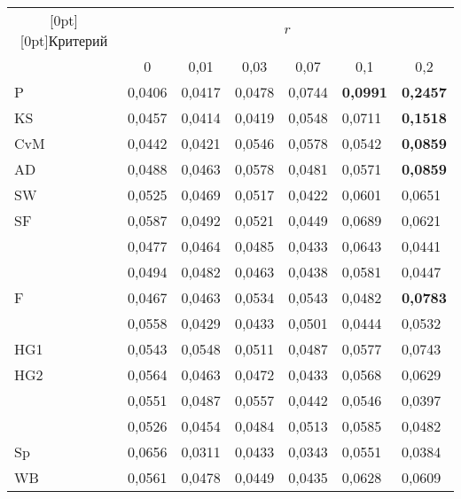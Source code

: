 \begin{table*}\small  %
\begin{center}
\vspace*{2ex}

\begin{tabular}{|l|l|l|l|l|l|l|}
\hline
\multicolumn{1}{|c|}{\raisebox{-6pt}[0pt][0pt]{Критерий}}& \multicolumn{6}{c|}{$r$}\\
\cline{2-7}
&\multicolumn{1}{c|}{0}&\multicolumn{1}{c|}{0,01}&
\multicolumn{1}{c|}{0,03}&\multicolumn{1}{c|}{0,07}&\multicolumn{1}{c|}{0,1}&\multicolumn{1}{c|}{0,2}\\
\hline
\hspace*{4mm}P&0,0406&0,0417&0,0478&0,0744&{\bf 0,0991}&{\bf 0,2457}\\
\hspace*{4mm}KS&0,0457&0,0414&0,0419&0,0548&0,0711&{\bf 0,1518}\\
\hspace*{4mm}CvM&0,0442&0,0421&0,0546&0,0578&0,0542&{\bf 0,0859}\\
\hspace*{4mm}AD&0,0488&0,0463&0,0578&0,0481&0,0571&{\bf 0,0859}\\
\hspace*{4mm}SW&0,0525&0,0469&0,0517&0,0422&0,0601&0,0651\\
\hspace*{4mm}SF&0,0587&0,0492&0,0521&0,0449&0,0689&0,0621\\
\hspace*{4mm}{\bf JB}&0,0477&0,0464&0,0485&0,0433&0,0643&0,0441\\
\hspace*{4mm}{\bf AJB}&0,0494&0,0482&0,0463&0,0438&0,0581&0,0447\\
\hspace*{4mm}F&0,0467&0,0463&0,0534&0,0543&0,0482&{\bf 0,0783}\\
\hspace*{4mm}{\bf G}&0,0558&0,0429&0,0433&0,0501&0,0444&0,0532\\
\hspace*{4mm}HG1&0,0543&0,0548&0,0511&0,0487&0,0577&0,0743\\
\hspace*{4mm}HG2&0,0564&0,0463&0,0472&0,0433&0,0568&0,0629\\
\hspace*{4mm}{\bf K}&0,0551&0,0487&0,0557&0,0442&0,0546&0,0397\\
\hspace*{4mm}{\bf S}&0,0526&0,0454&0,0484&0,0513&0,0585&0,0482\\
\hspace*{4mm}Sp&0,0656&0,0311&0,0433&0,0343&0,0551&0,0384\\
\hspace*{4mm}WB&0,0561&0,0478&0,0449&0,0435&0,0628&0,0609\\
\hline
\end{tabular}
\end{center}
\vspace*{-12pt}
\end{table*}


